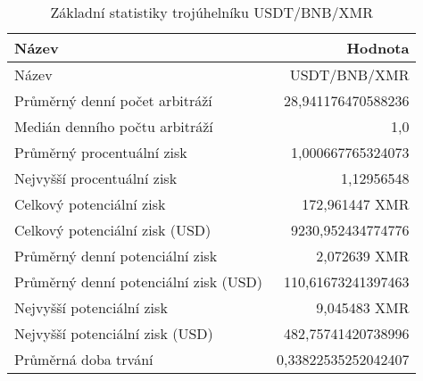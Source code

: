 \begin{table}\centering
\caption{Základní statistiky trojúhelníku USDT/BNB/XMR}
\label{USDTBNBXMR_stats}
\begin{tabular}{|| l | r ||}
\hline Název & Hodnota \\ 
\hline\hline Název & USDT/BNB/XMR \\ 
\hline Průměrný denní počet arbitráží & 28,941176470588236 \\ 
\hline Medián denního počtu arbitráží & 1,0 \\ 
\hline Průměrný procentuální zisk & 1,000667765324073 \\ 
\hline Nejvyšší procentuální zisk & 1,12956548 \\ 
\hline Celkový potenciální zisk & 172,961447 XMR \\ 
\hline Celkový potenciální zisk (USD) & 9230,952434774776 \\ 
\hline Průměrný denní potenciální zisk & 2,072639 XMR \\ 
\hline Průměrný denní potenciální zisk (USD) & 110,61673241397463 \\ 
\hline Nejvyšší potenciální zisk & 9,045483 XMR \\ 
\hline Nejvyšší potenciální zisk (USD) & 482,75741420738996 \\ 
\hline Průměrná doba trvání & 0,33822535252042407 \\ 
\hline
\end{tabular}
\end{table}